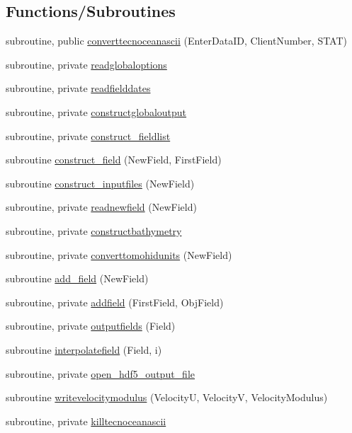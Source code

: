 \subsection*{Functions/\+Subroutines}
\begin{DoxyCompactItemize}
\item 
subroutine, public \mbox{\hyperlink{namespacemoduletecnoceanascii_a911ff8ebfeb289d3cf85e2a5a6543289}{converttecnoceanascii}} (Enter\+Data\+ID, Client\+Number, S\+T\+AT)
\item 
subroutine, private \mbox{\hyperlink{namespacemoduletecnoceanascii_a03b597bccde1ea1f6661a59bd7599167}{readglobaloptions}}
\item 
subroutine, private \mbox{\hyperlink{namespacemoduletecnoceanascii_a46dae8318879d56217ce0452e09fa5a5}{readfielddates}}
\item 
subroutine, private \mbox{\hyperlink{namespacemoduletecnoceanascii_ac3c04e7c0109f285ad61e9110701e6ce}{constructglobaloutput}}
\item 
subroutine, private \mbox{\hyperlink{namespacemoduletecnoceanascii_af8c388a8fbef00e24b5198034a12ff26}{construct\+\_\+fieldlist}}
\item 
subroutine \mbox{\hyperlink{namespacemoduletecnoceanascii_a5faf63426f042e591c210443525285aa}{construct\+\_\+field}} (New\+Field, First\+Field)
\item 
subroutine \mbox{\hyperlink{namespacemoduletecnoceanascii_a974670f0506425b9522707dfc6ef649c}{construct\+\_\+inputfiles}} (New\+Field)
\item 
subroutine, private \mbox{\hyperlink{namespacemoduletecnoceanascii_a3a6fefcdee1dbb139d00be33aaf2e48f}{readnewfield}} (New\+Field)
\item 
subroutine, private \mbox{\hyperlink{namespacemoduletecnoceanascii_a9bbaf3300cee7d2c04f566610643dbe8}{constructbathymetry}}
\item 
subroutine, private \mbox{\hyperlink{namespacemoduletecnoceanascii_acb08e8b922f987a8851cdd00f46ab1ac}{converttomohidunits}} (New\+Field)
\item 
subroutine \mbox{\hyperlink{namespacemoduletecnoceanascii_a3b498ef686c47e5dae7627d7045ed16a}{add\+\_\+field}} (New\+Field)
\item 
subroutine, private \mbox{\hyperlink{namespacemoduletecnoceanascii_a361f990e2a215ebad88b6439bbc0ccaf}{addfield}} (First\+Field, Obj\+Field)
\item 
subroutine, private \mbox{\hyperlink{namespacemoduletecnoceanascii_a690ef71c676ca809af1adce385db6855}{outputfields}} (Field)
\item 
subroutine \mbox{\hyperlink{namespacemoduletecnoceanascii_a305beb20ba1bce59460e369c5385e130}{interpolatefield}} (Field, i)
\item 
subroutine, private \mbox{\hyperlink{namespacemoduletecnoceanascii_a59efcea92a5574ed7914c0950859e175}{open\+\_\+hdf5\+\_\+output\+\_\+file}}
\item 
subroutine \mbox{\hyperlink{namespacemoduletecnoceanascii_aa4e611e7a40208b6cd2a72c6a6ee06f7}{writevelocitymodulus}} (VelocityU, VelocityV, Velocity\+Modulus)
\item 
subroutine, private \mbox{\hyperlink{namespacemoduletecnoceanascii_a324e7114be8b0d39a6c4a80c55f2dcc1}{killtecnoceanascii}}
\end{DoxyCompactItemize}
